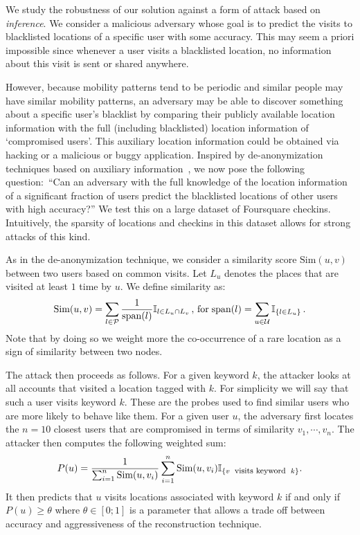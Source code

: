 We study the robustness of our solution against a form of attack based on \emph{inference}.
We consider a malicious adversary whose goal is to predict the visits to blacklisted locations of 
a specific user with some accuracy.
This may seem a priori impossible since whenever a user visits a blacklisted location, no information about this visit 
is sent or shared anywhere. 

However, because mobility patterns tend to be periodic and similar people may have similar mobility patterns, an adversary 
may be able to discover something about a specific user's blacklist by comparing their publicly available location information 
with the full (including blacklisted) location information of `compromised users'.
This auxiliary location information could be obtained via hacking or a malicious or buggy application.
Inspired by de-anonymization techniques based on auxiliary information~\cite{Narayanan:2008iu}, we now pose the following question:~``Can an adversary with the full knowledge of the location information of a significant 
fraction of users predict the blacklisted locations of other users with high accuracy?'' 
We test this on a large dataset of Foursquare checkins.
Intuitively, the sparsity of locations and checkins in this dataset allows for strong attacks of this kind.

\newcommand{\simil}{\textrm{Sim}}
\newcommand{\spann}{\textrm{span}}
As in the de-anonymization technique, we consider a similarity score $\simil(u,v)$ between two users based on common visits. Let $L_u$ denotes the places that are visited at least $1$ time by $u$. We define similarity as:
\[
\simil(u,v) = \sum_{l\in\setL} \frac{1}{\spann(l)} \mathbb{I}_{l\in L_u\cap L_v} \vf
\textrm{for}\; 
\spann(l) = \sum_{u\in\setU} \mathbb{I}_{\{l\in L_u\}}\ff
\]
Note that by doing so we weight more the co-occurrence of a rare location as a sign of similarity between two nodes.

The attack then proceeds as follows. For a given keyword $k$, the attacker looks at all accounts that visited a location tagged with $k$. For simplicity we will say that such a user visits keyword $k$. These are the probes used to find similar users who are more likely to behave like them. For a given user $u$, the adversary first locates the $n=10$ closest users that are compromised in terms of similarity $v_1,\cdots,v_{n}$. 
The attacker then computes the following weighted sum:
\[
P(u) = 
\frac{1}{\sum_{i=1}^{n} \simil(u,v_i)} 
\sum_{i=1}^{n} \simil(u,v_i) \mathbb{I}_{\{v \midwor{\footnotesize visits keyword}k\}}.
\]
It then predicts that $u$ visits locations associated with keyword $k$ if and only if $P(u)\geq \theta$ where $\theta\in[0;1]$ is a parameter that allows a trade off between accuracy and aggressiveness of the reconstruction technique.

